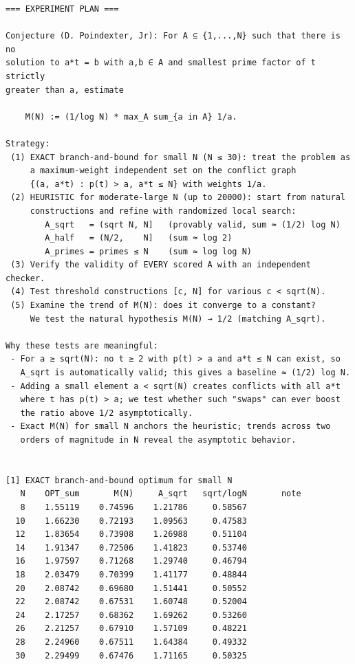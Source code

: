 \documentclass[11pt]{article}
\begin{document}
\begin{lstlisting}
=== EXPERIMENT PLAN ===

Conjecture (D. Poindexter, Jr): For A ⊆ {1,...,N} such that there is no
solution to a*t = b with a,b ∈ A and smallest prime factor of t strictly
greater than a, estimate

    M(N) := (1/log N) * max_A sum_{a in A} 1/a.

Strategy:
 (1) EXACT branch-and-bound for small N (N ≤ 30): treat the problem as
     a maximum-weight independent set on the conflict graph
     {(a, a*t) : p(t) > a, a*t ≤ N} with weights 1/a.
 (2) HEURISTIC for moderate-large N (up to 20000): start from natural
     constructions and refine with randomized local search:
        A_sqrt   = (sqrt N, N]   (provably valid, sum ≈ (1/2) log N)
        A_half   = (N/2,    N]   (sum ≈ log 2)
        A_primes = primes ≤ N    (sum ≈ log log N)
 (3) Verify the validity of EVERY scored A with an independent checker.
 (4) Test threshold constructions [c, N] for various c < sqrt(N).
 (5) Examine the trend of M(N): does it converge to a constant?
     We test the natural hypothesis M(N) → 1/2 (matching A_sqrt).

Why these tests are meaningful:
 - For a ≥ sqrt(N): no t ≥ 2 with p(t) > a and a*t ≤ N can exist, so
   A_sqrt is automatically valid; this gives a baseline ≈ (1/2) log N.
 - Adding a small element a < sqrt(N) creates conflicts with all a*t
   where t has p(t) > a; we test whether such "swaps" can ever boost
   the ratio above 1/2 asymptotically.
 - Exact M(N) for small N anchors the heuristic; trends across two
   orders of magnitude in N reveal the asymptotic behavior.


[1] EXACT branch-and-bound optimum for small N
   N    OPT_sum       M(N)     A_sqrt   sqrt/logN       note
   8    1.55119    0.74596    1.21786     0.58567           
  10    1.66230    0.72193    1.09563     0.47583           
  12    1.83654    0.73908    1.26988     0.51104           
  14    1.91347    0.72506    1.41823     0.53740           
  16    1.97597    0.71268    1.29740     0.46794           
  18    2.03479    0.70399    1.41177     0.48844           
  20    2.08742    0.69680    1.51441     0.50552           
  22    2.08742    0.67531    1.60748     0.52004           
  24    2.17257    0.68362    1.69262     0.53260           
  26    2.21257    0.67910    1.57109     0.48221           
  28    2.24960    0.67511    1.64384     0.49332           
  30    2.29499    0.67476    1.71165     0.50325           


\end{lstlisting}
\end{document}
